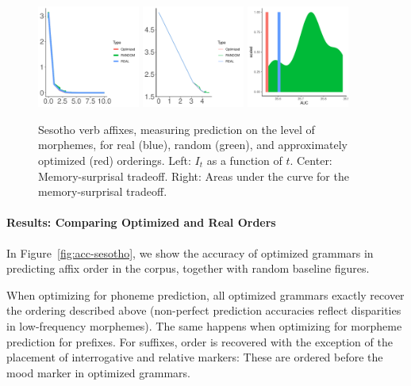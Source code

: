 \begin{figure}
	\begin{center}
\includegraphics[width=0.3\textwidth]{figures/Sesotho-suffixes-byMorphemes-it.pdf}
\includegraphics[width=0.3\textwidth]{figures/Sesotho-suffixes-byMorphemes-memsurp.pdf}
\includegraphics[width=0.3\textwidth]{figures/Sesotho-suffixes-byMorphemes-auc-hist.pdf}
\end{center}
	\caption{Sesotho verb affixes, measuring prediction on the level of morphemes, for real (blue), random (green), and approximately optimized (red) orderings. Left: $I_t$ as a function of $t$. Center: Memory-surprisal tradeoff. Right: Areas under the curve for the memory-surprisal tradeoff.}\label{fig:jap-morph}
\end{figure}


\paragraph{Results: Comparing Optimized and Real Orders}

In Figure~\ref{fig:acc-sesotho}, we show the accuracy of optimized grammars in predicting affix order in the corpus, together with random baseline figures.


When optimizing for phoneme prediction, all optimized grammars exactly recover the ordering described above (non-perfect prediction accuracies reflect disparities in low-frequency morphemes).
The same happens when optimizing for morpheme prediction for prefixes.
For suffixes, order is recovered with the exception of the placement of interrogative and relative markers: These are ordered before the mood marker in optimized grammars.


